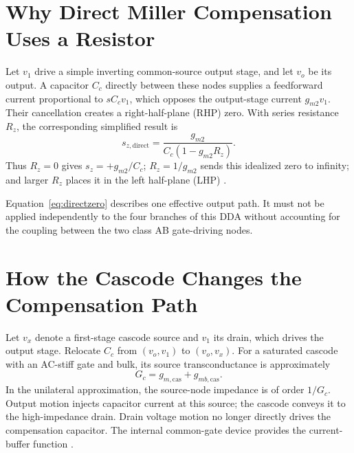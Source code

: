 \documentclass[10pt,journal]{IEEEtran}
\newcommand{\gm}{g_{m2}}
\newcommand{\Gc}{G_c}
\begin{document}
\section{Why Direct Miller Compensation Uses a Resistor}
Let $v_1$ drive a simple inverting common-source output stage, and let $v_o$ be its output. A capacitor $C_c$ directly between these nodes supplies a feedforward current proportional to $sC_c v_1$, which opposes the output-stage current $\gm v_1$. Their cancellation creates a right-half-plane (RHP) zero. With series resistance $R_z$, the corresponding simplified result is
\begin{equation}
 s_{z,\mathrm{direct}}=
 \frac{\gm}{C_c(1-\gm R_z)}.
 \label{eq:directzero}
\end{equation}
Thus $R_z=0$ gives $s_z=+\gm/C_c$; $R_z=1/\gm$ sends this idealized zero to infinity; and larger $R_z$ places it in the left half-plane (LHP) \cite{ahuja}.

Equation~\eqref{eq:directzero} describes one effective output path. It must not be applied independently to the four branches of this DDA without accounting for the coupling between the two class AB gate-driving nodes.

\section{How the Cascode Changes the Compensation Path}
Let $v_x$ denote a first-stage cascode source and $v_1$ its drain, which drives the output stage. Relocate $C_c$ from $(v_o,v_1)$ to $(v_o,v_x)$. For a saturated cascode with an AC-stiff gate and bulk, its source transconductance is approximately
\begin{equation}
 \Gc=g_{m,\mathrm{cas}}+g_{mb,\mathrm{cas}}.
\end{equation}
In the unilateral approximation, the source-node impedance is of order $1/\Gc$. Output motion injects capacitor current at this source; the cascode conveys it to the high-impedance drain. Drain voltage motion no longer directly drives the compensation capacitor. The internal common-gate device provides the current-buffer function \cite{saxena2008}.
\end{document}
